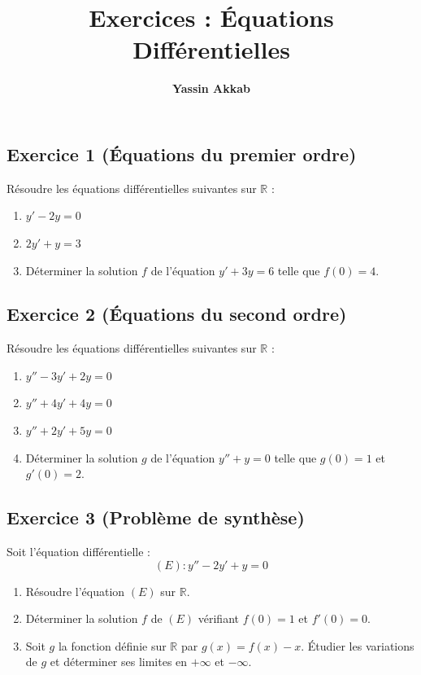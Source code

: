 \documentclass{article}
\title{\textbf{Exercices : Équations Différentielles}}
\author{\textbf{Yassin Akkab}}
\begin{document}
	
	\maketitle
	
	\subsection*{Exercice 1 (Équations du premier ordre)}
	Résoudre les équations différentielles suivantes sur $\mathbb{R}$ :
	\begin{enumerate}
		\item $y' - 2y = 0$
		\item $2y' + y = 3$
		\item Déterminer la solution $f$ de l'équation $y' + 3y = 6$ telle que $f(0) = 4$.
	\end{enumerate}
	
	\subsection*{Exercice 2 (Équations du second ordre)}
	Résoudre les équations différentielles suivantes sur $\mathbb{R}$ :
	\begin{enumerate}
		\item $y'' - 3y' + 2y = 0$
		\item $y'' + 4y' + 4y = 0$
		\item $y'' + 2y' + 5y = 0$
		\item Déterminer la solution $g$ de l'équation $y'' + y = 0$ telle que $g(0) = 1$ et $g'(0) = 2$.
	\end{enumerate}
	
	\subsection*{Exercice 3 (Problème de synthèse)}
	Soit l'équation différentielle :
	\[ (E) : y'' - 2y' + y = 0 \]
	\begin{enumerate}
		\item Résoudre l'équation $(E)$ sur $\mathbb{R}$.
		\item Déterminer la solution $f$ de $(E)$ vérifiant $f(0) = 1$ et $f'(0) = 0$.
		\item Soit $g$ la fonction définie sur $\mathbb{R}$ par $g(x) = f(x) - x$.
		Étudier les variations de $g$ et déterminer ses limites en $+\infty$ et $-\infty$.
	\end{enumerate}
	
\end{document}
